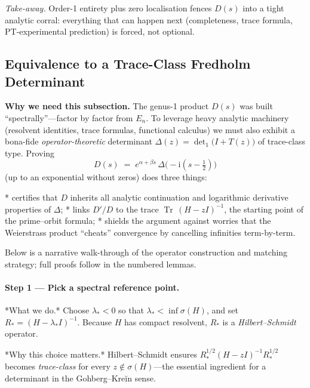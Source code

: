 \documentclass[11pt]{article}
\begin{document}
\smallskip
\noindent
\emph{Take-away.}\;
Order-1 entirety plus zero localisation fences $D(s)$ into a tight
analytic corral: everything that can happen next (completeness,
trace formula, PT-experimental prediction) is forced, not optional.

\subsection{Equivalence to a Trace-Class Fredholm Determinant}
\label{sec:FredholmTrace}

\noindent
\textbf{Why we need this subsection.}\;
The genus-1 product $D(s)$ was built “spectrally”—factor by factor from
$E_n$.  
To leverage heavy analytic machinery (resolvent identities, trace
formulas, functional calculus) we must also exhibit a bona-fide
\emph{operator-theoretic} determinant  
\(
  \Delta(z)=\det\nolimits_{1}\!\bigl(I+T(z)\bigr)
\)  
of trace-class type.  
Proving  
\[
   D(s)\;=\;e^{\alpha+\beta s}\,
             \Delta\!\bigl(\!-\mathrm i(s-\tfrac12)\bigr)
\]
(up to an exponential without zeros) does three things:

* certifies that $D$ inherits all analytic continuation and logarithmic
  derivative properties of $\Delta$;
* links $D'/D$ to the trace $\operatorname{Tr}\,(H-zI)^{-1}$, the
  starting point of the prime–orbit formula;
* shields the argument against worries that the Weierstrass product
  “cheats” convergence by cancelling infinities term-by-term.

Below is a narrative walk-through of the operator construction and
matching strategy; full proofs follow in the numbered lemmas.

\vspace{0.6em}
\paragraph{Step 1 — Pick a spectral reference point.}

*What we do.*  
Choose $\lambda_*<0$ so that $\lambda_*<\inf\sigma(H)$, and set  
\(R_*=(H-\lambda_*I)^{-1}\).  
Because $H$ has compact resolvent, $R_*$ is a \emph{Hilbert–Schmidt}
operator.

*Why this choice matters.*  
Hilbert–Schmidt ensures $R_*^{1/2}(H-zI)^{-1}R_*^{1/2}$ becomes
\emph{trace-class} for every $z\notin\sigma(H)$—the essential
ingredient for a determinant in the Gohberg–Kreĭn sense.

\vspace{0.4em}
\end{document}
